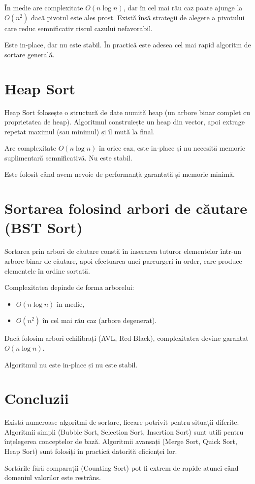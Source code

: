 \documentclass[12pt]{article}
\begin{document}
În medie are complexitate $O(n \log n)$, dar în cel mai rău caz poate ajunge la
$O(n^2)$ dacă pivotul este ales prost. Există însă strategii de alegere a
pivotului care reduc semnificativ riscul cazului nefavorabil.

Este in-place, dar nu este stabil. În practică este adesea cel mai rapid algoritm
de sortare generală.

\section{Heap Sort}

Heap Sort folosește o structură de date numită heap (un arbore binar complet cu
proprietatea de heap). Algoritmul construiește un heap din vector, apoi extrage
repetat maximul (sau minimul) și îl mută la final.

Are complexitate $O(n \log n)$ în orice caz, este in-place și nu necesită memorie
suplimentară semnificativă. Nu este stabil.

Este folosit când avem nevoie de performanță garantată și memorie minimă.

\section{Sortarea folosind arbori de căutare (BST Sort)}

Sortarea prin arbori de căutare constă în inserarea tuturor elementelor într-un
arbore binar de căutare, apoi efectuarea unei parcurgeri in-order, care produce
elementele în ordine sortată.

Complexitatea depinde de forma arborelui:
\begin{itemize}
    \item $O(n \log n)$ în medie,
    \item $O(n^2)$ în cel mai rău caz (arbore degenerat).
\end{itemize}

Dacă folosim arbori echilibrați (AVL, Red-Black), complexitatea devine garantat
$O(n \log n)$.

Algoritmul nu este in-place și nu este stabil.

\section{Concluzii}

Există numeroase algoritmi de sortare, fiecare potrivit pentru situații diferite.
Algoritmii simpli (Bubble Sort, Selection Sort, Insertion Sort) sunt utili pentru
înțelegerea conceptelor de bază. Algoritmii avansați (Merge Sort, Quick Sort,
Heap Sort) sunt folosiți în practică datorită eficienței lor.

Sortările fără comparații (Counting Sort) pot fi extrem de rapide atunci când
domeniul valorilor este restrâns.
\end{document}
